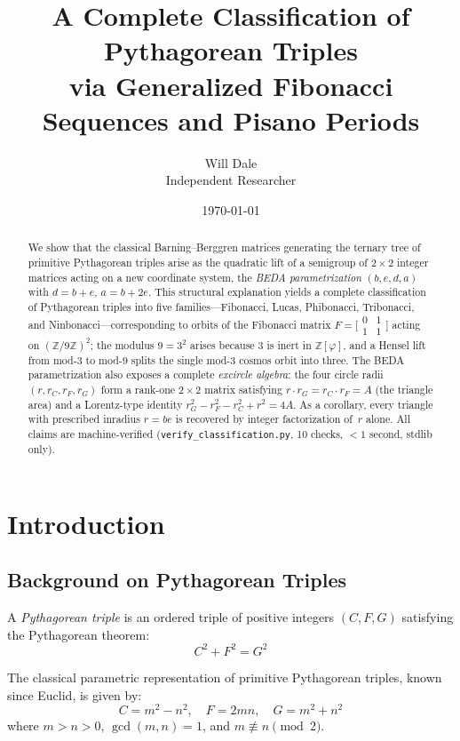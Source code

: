 \documentclass[12pt]{article}
\title{A Complete Classification of Pythagorean Triples\\via Generalized Fibonacci Sequences and Pisano Periods}
\author{Will Dale\\[4pt]
\small Independent Researcher}
\date{\today}
\begin{document}
\maketitle

\begin{abstract}
We show that the classical Barning--Berggren matrices generating the ternary tree of
primitive Pythagorean triples arise as the quadratic lift of a semigroup of
$2\times2$ integer matrices acting on a new coordinate system, the
\emph{BEDA parametrization} $(b,e,d,a)$ with $d=b+e$, $a=b+2e$.  This structural
explanation yields a complete classification of Pythagorean triples into five
families---Fibonacci, Lucas, Phibonacci, Tribonacci, and Ninbonacci---corresponding
to orbits of the Fibonacci matrix
$F=\bigl[\begin{smallmatrix}0&1\\1&1\end{smallmatrix}\bigr]$ acting on
$(\mathbb{Z}/9\mathbb{Z})^2$; the modulus $9=3^2$ arises because $3$ is inert in
$\mathbb{Z}[\varphi]$, and a Hensel lift from mod-$3$ to mod-$9$ splits the single
mod-$3$ cosmos orbit into three.  The BEDA parametrization also exposes a complete
\emph{excircle algebra}: the four circle radii $(r, r_C, r_F, r_G)$ form a rank-one
$2\times2$ matrix satisfying $r\cdot r_G = r_C\cdot r_F = A$ (the triangle area)
and a Lorentz-type identity $r_G^2 - r_F^2 - r_C^2 + r^2 = 4A$.  As a corollary,
every triangle with prescribed inradius $r=be$ is recovered by integer factorization
of~$r$ alone.  All claims are machine-verified (\texttt{verify\_classification.py},
10 checks, ${<}1$ second, stdlib only).
\end{abstract}

\section{Introduction}

\subsection{Background on Pythagorean Triples}

A \emph{Pythagorean triple} is an ordered triple of positive integers $(C, F, G)$ satisfying the Pythagorean theorem:
\begin{equation}
C^2 + F^2 = G^2
\end{equation}

The classical parametric representation of primitive Pythagorean triples, known since Euclid, is given by:
\begin{equation}
C = m^2 - n^2, \quad F = 2mn, \quad G = m^2 + n^2
\end{equation}
where $m > n > 0$, $\gcd(m,n) = 1$, and $m \not\equiv n \pmod{2}$.
\end{document}
